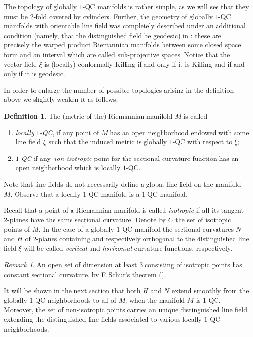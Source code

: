 \documentclass[JEP,XML,SOM,Unicode]{cedram}
\theoremstyle{definition}
\newtheorem{definition}[theorem]{Definition}
\theoremstyle{remark}
\newtheorem{remark}[theorem]{Remark}
\numberwithin{equation}{section}
\begin{document}
The topology of globally $1$-QC manifolds is rather
simple, as we will see that they must be 2-fold covered by cylinders.
Further, the geometry of globally $1$-QC manifolds with orientable line field was completely described
under an additional condition (namely, that the distinguished field
be geodesic) in \cite[\S6]{GM}:
these are precisely the warped product Riemannian manifolds
between some closed space form and an interval which are called
sub-projective spaces. Notice that the vector field $\xi$ is (locally) conformally Killing if and only if it is Killing and if and only if it is geodesic.

In order to enlarge the number of possible topologies arising in the definition above we slightly weaken it as follows.

\begin{definition}
The (metric of the) Riemannian manifold $M$ is called
\begin{enumerate}
\item \emph{locally $1$-QC},
if any point of $M$ has an open neighborhood endowed with some line field $\xi$ such that
the induced metric is globally $1$-QC with respect to $\xi$;
\item \emph{$1$-QC} if any \emph{non-isotropic} point for the sectional curvature
function has an open neighborhood which is locally $1$-QC.
\end{enumerate}
\end{definition}
Note that line fields do not necessarily define a global line field on the manifold~$M$.
Observe that a locally $1$-QC manifold is a $1$-QC manifold.

Recall that a point of a Riemannian manifold is called \emph{isotropic}
if all its tangent $2$\nobreakdash-planes have the same sectional curvature.
Denote by $C$ the set of isotropic points of $M$.
In the case of a globally $1$-QC manifold the sectional curvatures $N$ and $H$
of $2$\nobreakdash-planes containing and respectively orthogonal to
the distinguished line field $\xi$ will be called \emph{vertical} and \emph{horizontal}
curvature functions, respectively.

\begin{remark}
An open set of dimension at least $3$ consisting of isotropic points has constant sectional
curvature, by F.\,Schur's theorem (\cite{Sch}).
\end{remark}

It will be shown in the next section that both $H$ and $N$ extend smoothly from the globally $1$-QC
neighborhoods to all of $M$, when the manifold $M$ is $1$-QC. Moreover, the set of non-isotropic points
carries an unique distinguished line field extending the distinguished line fields associated to various
locally $1$-QC neighborhoods.
\end{document}
